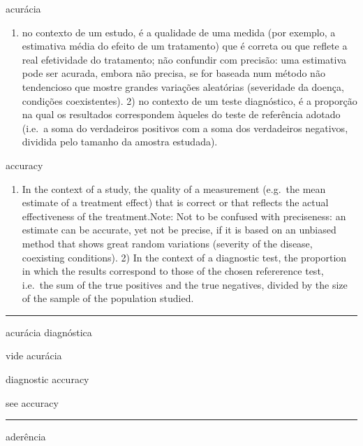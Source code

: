 \documentclass[
]{book}
\providecommand{\tightlist}{%
  \setlength{\itemsep}{0pt}\setlength{\parskip}{0pt}}
\begin{document}
acurácia

\begin{enumerate}
\def\labelenumi{\arabic{enumi})}
\tightlist
\item
  no contexto de um estudo, é a qualidade de uma medida (por exemplo, a estimativa média do efeito de um tratamento) que é correta ou que reflete a real efetividade do tratamento; não confundir com precisão: uma estimativa pode ser acurada, embora não precisa, se for baseada num método não tendencioso que mostre grandes variações aleatórias (severidade da doença, condições coexistentes). 2) no contexto de um teste diagnóstico, é a proporção na qual os resultados correspondem àqueles do teste de referência adotado (i.e.~a soma do verdadeiros positivos com a soma dos verdadeiros negativos, dividida pelo tamanho da amostra estudada).
\end{enumerate}

accuracy

\begin{enumerate}
\def\labelenumi{\arabic{enumi})}
\tightlist
\item
  In the context of a study, the quality of a measurement (e.g.~the mean estimate of a treatment effect) that is correct or that reflects the actual effectiveness of the treatment.Note: Not to be confused with preciseness: an estimate can be accurate, yet not be precise, if it is based on an unbiased method that shows great random variations (severity of the disease, coexisting conditions). 2) In the context of a diagnostic test, the proportion in which the results correspond to those of the chosen refererence test, i.e.~the sum of the true positives and the true negatives, divided by the size of the sample of the population studied.
\end{enumerate}

\begin{center}\rule{0.5\linewidth}{0.5pt}\end{center}

acurácia diagnóstica

vide acurácia

diagnostic accuracy

see accuracy

\begin{center}\rule{0.5\linewidth}{0.5pt}\end{center}

aderência
\end{document}
